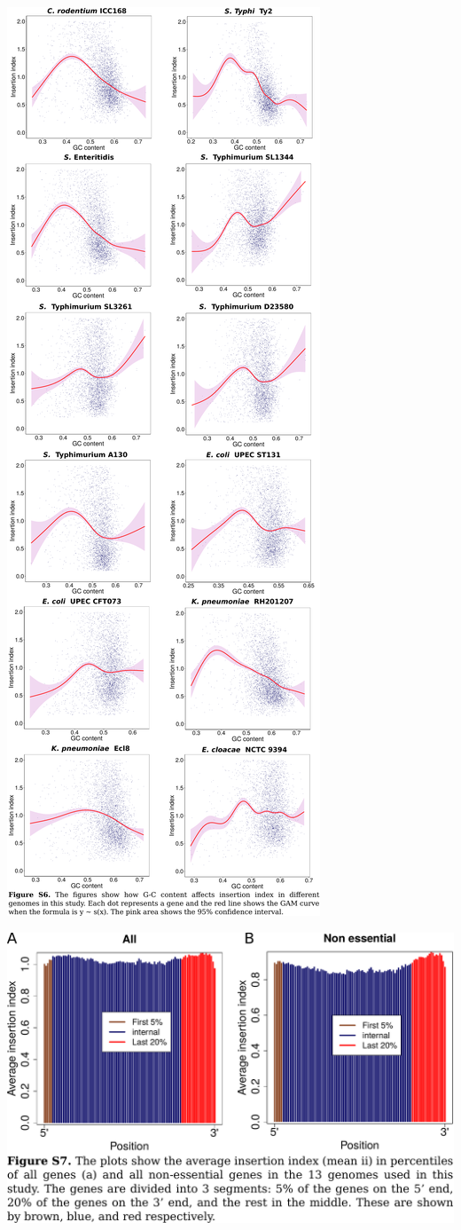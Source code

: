 \documentclass{article}
\newcommand{\Newpage}{\end{preview}\begin{preview}}
\begin{document}
\begin{preview}
\Newpage
\includegraphics{suppl6.pdf}
\Newpage
\includegraphics{suppl7.pdf}

\end{preview}
\end{document}
